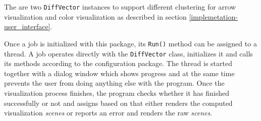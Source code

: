 The are two \verb+DiffVector+ instances to support different clustering for arrow visualization and color visualization as described in section \ref{implemetation-user_interface}.

Once a job is initialized with this package, its \verb+Run()+ method can be assigned to a thread. A job operates directly with the \verb+DiffVector+ class, initializes it and calls its methods according to the configuration package. The thread is started together with a dialog window which shows progress and at the same time prevents the user from doing anything else with the program. Once the visualization process finishes, the program checks whether it has finished successfully or not and assigns based on that either renders the computed visualization {\it scenes} or reports an error and renders the raw {\it scenes}.